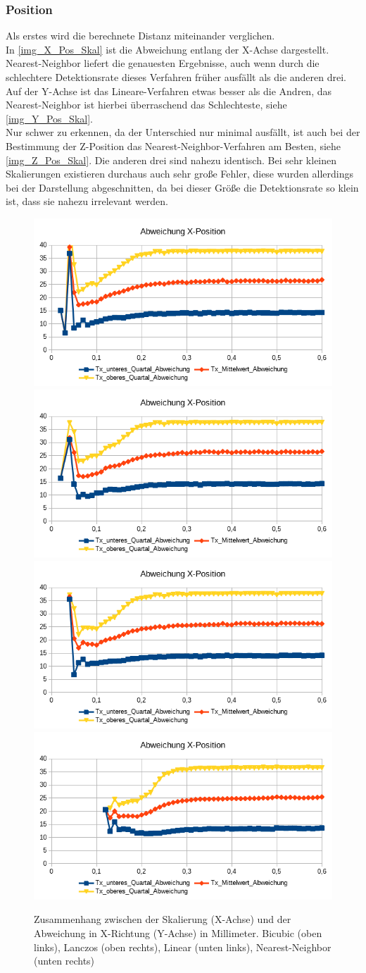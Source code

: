 \subsubsection{Position}
Als erstes wird die berechnete Distanz miteinander verglichen.\\
In \autoref{img_X_Pos_Skal} ist die Abweichung entlang der X-Achse dargestellt. Nearest-Neighbor liefert die genauesten Ergebnisse, auch wenn durch die schlechtere Detektionsrate dieses Verfahren früher ausfällt als die anderen drei.\\
Auf der Y-Achse ist das Lineare-Verfahren etwas besser als die Andren, das Nearest-Neighbor ist hierbei überraschend das Schlechteste, siehe \autoref{img_Y_Pos_Skal}.\\
Nur schwer zu erkennen, da der Unterschied nur minimal ausfällt, ist auch bei der Bestimmung der Z-Position das Nearest-Neighbor-Verfahren am Besten, siehe \autoref{img_Z_Pos_Skal}. Die anderen drei sind nahezu identisch. Bei sehr kleinen Skalierungen existieren durchaus auch sehr große Fehler, diese wurden allerdings bei der Darstellung abgeschnitten, da bei dieser Größe die Detektionsrate so klein ist, dass sie nahezu irrelevant werden.
\begin{figure}
	\centering
	\includegraphics[width=0.45\linewidth]{tabelle2/X_Pos_Cubic}
	\includegraphics[width=0.45\linewidth]{tabelle2/X_Pos_Lanc}
	\includegraphics[width=0.45\linewidth]{tabelle2/X_Pos_Linear}
	\includegraphics[width=0.45\linewidth]{tabelle2/X_Pos_NN}
	\caption{Zusammenhang zwischen der Skalierung (X-Achse) und der Abweichung in X-Richtung (Y-Achse) in Millimeter. 
	 Bicubic (oben links), Lanczos (oben rechts), Linear (unten links), Nearest-Neighbor (unten rechts)}
	\label{img_X_Pos_Skal}
\end{figure}
